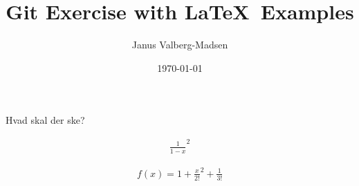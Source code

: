 \documentclass[11pt,a4paper]{article}
\title{Git Exercise with \LaTeX\ Examples}
\author{Janus Valberg-Madsen}
\date{\today}
\begin{document}
\maketitle
Hvad skal der ske?

\begin{align}
\frac{1}{1-x}^2
\end{align}

\begin{align}
f(x)=1+\frac{x}{2!}^2+\frac{1}{3!}
\end{align}
\begin{abstract}
  
\end{abstract}

\tableofcontents



\end{document}
